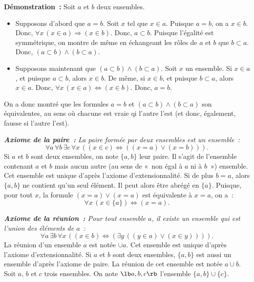 \noindent\textbf{Démonstration :} 
    Soit $a$ et $b$ deux ensembles. 
    \begin{itemize}[nosep]
        \item Supposons d'abord que $a = b$.
            Soit $x$ tel que $x \in a$. 
            Puisque $a = b$, on a $x \in b$. 
            Donc, $\forall x \, (x \in a) \Rightarrow (x \in b)$.
            Donc, $a \subset b$. 
            Puisque l'égalité est symmétrique, on montre de même en échangeant les rôles de $a$ et $b$ que $b \subset a$.
            Donc, $(a \subset b) \wedge (b \subset a)$. 
        \item Supposons maintenant que $(a \subset b) \wedge (b \subset a)$. 
            Soit $x$ un ensemble. 
            Si $x \in a$, et puisque $a \subset b$, alors $x \in b$.
            De même, si $x \in b$, et puisque $b \subset a$, alors $x \in a$.
            Donc, $\forall x \, (x \in a) \Leftrightarrow (x \in b)$. 
            Donc, $a = b$. 
    \end{itemize}
    On a donc montré que les formules $a = b$ et $(a \subset b) \wedge (b \subset a)$ son équivalentes, au sens où chacune est vraie qi l'autre l'est (et donc, également, fausse si l'autre l'est).

   \done 

\medskip

\noindent\textit{\textbf{Axiome de la paire :} La paire formée par deux ensembles est un ensemble :}
\begin{equation*}
    \forall a \, \forall b \, \exists c \, \forall x \, (
        (x \in c) \Leftrightarrow ((x = a) \vee (x = b))
    ).
\end{equation*}
Si $a$ et $b$ sont deux ensembles, on note $\lbrace a, b \rbrace$ leur paire. 
Il s'agit de l'ensemble contenant $a$ et $b$ mais aucun autre (au sens de « non égal à $a$ ni à $b$ ») ensemble. 
Cet ensemble est unique d'après l'axiome d'extensionnalité.
Si de plus $b = a$, alors $\lbrace a, b \rbrace$ ne contient qu'un seul élément. 
Il peut alors être abrégé en $\lbrace a \rbrace$. 
Puisque, pour tout $x$, la formule $(x = a) \vee (x=a)$ est équivalente à $x = a$, on a : 
\begin{equation*}
    \forall x \, (x \in \lbrace a \rbrace) \Leftrightarrow (x = a). 
\end{equation*}

\medskip

\noindent\textit{\textbf{Axiome de la réunion :} Pour tout ensemble $a$, il existe un ensemble qui est l'union des éléments de $a$ :}
\begin{equation*}
    \forall a \, \exists b \, \forall x \, (
        (x \in b) \Leftrightarrow (\exists y \, ((y \in a) \vee (x \in y)))
    ).
\end{equation*}
La réunion d'un ensemble $a$ est notée $\cup a$.
Cet ensemble est unique d'après l'axiome d'extensionnalité.
Si $a$ et $b$ sont deux ensembles, $\lbrace a, b \rbrace$ est aussi un ensemble d'après l'axiome de paire. 
La réunion de cet ensemble est notée $a \cup b$. 
Soit $a$, $b$ et $c$ trois ensembles. 
On note $\lb a, b, c \rb$ l'ensemble $\lbrace a, b \rbrace \cup \lbrace c \rbrace$. 


